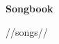 \documentclass[twoside,a4paper]{article}
\begin{document}
\strut
\vfill
\begin{center}
\sffamily
\bfseries
\fontsize{110pt}{90pt}
\selectfont
Songbook
\end{center}
\vfill

\cleardoublepage


\begin{multicols}{2}
\pagestyle{plain}
\tableofcontents
\cleardoublepage
\end{multicols}


\raggedcolumns

\begin{multicols*}{2}
\pagestyle{fancy}
//songs//
\end{multicols*}
\end{document}
